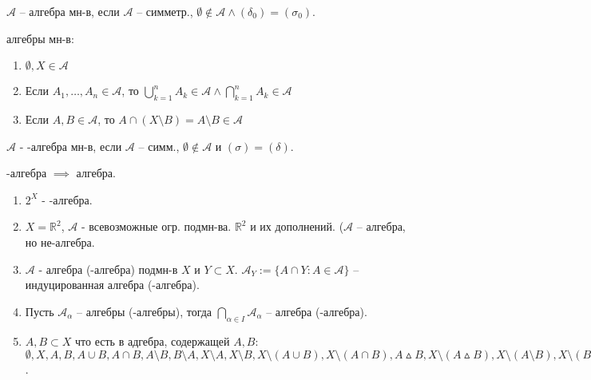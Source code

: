 \begin{definition}
    $\mathcal{A}$ -- алгебра мн-в, если $\mathcal{A}$ -- симметр., $\emptyset \notin \mathcal{A} \land (\delta_0) = (\sigma_0)$.
\end{definition}

\begin{properties}
    алгебры мн-в: 

    \begin{enumerate}
        \item {
            $\emptyset, X \in \mathcal{A}$
        }
        \item Если $A_1, \dots, A_n \in \mathcal{A}$, то $\bigcup_{k = 1}^n A_k \in \mathcal{A} \land \bigcap_{k = 1}^n A_k \in \mathcal{A}$
        \item Если $A, B \in \mathcal{A}$, то $A \cap (X \setminus B) = A \setminus B \in \mathcal{A}$
    \end{enumerate}
\end{properties}

\begin{definition}
    $\mathcal{A}$ - \sigma-алгебра мн-в, если $\mathcal{A}$ -- симм., $\emptyset \notin \mathcal{A}$ и $(\sigma) = (\delta)$.
\end{definition}

\begin{remark}
    \sigma-алгебра $\implies$ алгебра.
\end{remark}

\begin{example}
    \begin{enumerate}
        \item $2^X$ - \sigma-алгебра.
        \item $X = \mathbb{R}^2$, $\mathcal{A}$ - всевозможные огр. подмн-ва. $\mathbb{R}^2$ и их дополнений. ($\mathcal{A}$ -- алгебра, но не\sigma-алгебра.
        \item $\mathcal{A}$ - алгебра (\sigma-алгебра) подмн-в $X$ и $Y \subset X$. $\mathcal{A}_{Y} := \{A \cap Y : A \in \mathcal{A}\}$ -- индуцированная алгебра (\sigma-алгебра).
        \item Пусть $\mathcal{A}_{\alpha}$ -- алгебры (\sigma-алгебры), тогда $\bigcap_{\alpha \in I}\mathcal{A}_{\alpha}$ -- алгебра (\sigma-алгебра).
        \item $A, B \subset X$ что есть в адгебра, содержащей $A, B$: \\ $\emptyset, X, A, B, A \cup B, A \cap B, A \setminus B, B \setminus A, X \setminus A, X \setminus B, X \setminus (A \cup B), X \setminus (A \cap B), A \vartriangle B, X \setminus (A \vartriangle B), X \setminus (A \setminus B), X \setminus (B \setminus A)$.
    \end{enumerate}
\end{example}

